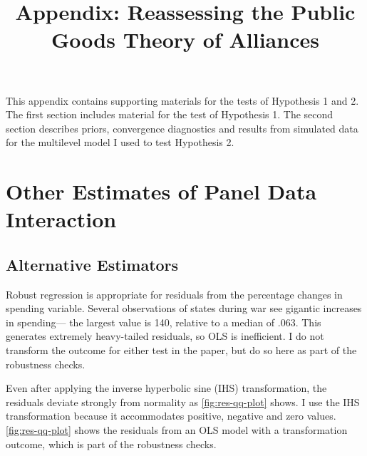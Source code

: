 \documentclass[12pt]{article}
\title{
\textbf{Appendix: Reassessing the Public Goods Theory of Alliances}
	}
\begin{document}
\maketitle 

\doublespace

This appendix contains supporting materials for the tests of Hypothesis 1 and 2. 
The first section includes material for the test of Hypothesis 1. 
The second section describes priors, convergence diagnostics and results from simulated data for the multilevel model I used to test Hypothesis 2. 

\section{Other Estimates of Panel Data Interaction}


\subsection{Alternative Estimators}


Robust regression is appropriate for residuals from the percentage changes in spending variable. 
Several observations of states during war see gigantic increases in spending--- the largest value is 140, relative to a median of .063. 
This generates extremely heavy-tailed residuals, so OLS is inefficient. 
I do not transform the outcome for either test in the paper, but do so here as part of the robustness checks. 


Even after applying the inverse hyperbolic sine (IHS) transformation, the residuals deviate strongly from normality as \autoref{fig:res-qq-plot} shows. 
I use the IHS transformation because it accommodates positive, negative and zero values. 
\autoref{fig:res-qq-plot} shows the residuals from an OLS model with a transformation outcome, which is part of the robustness checks.
\end{document}
